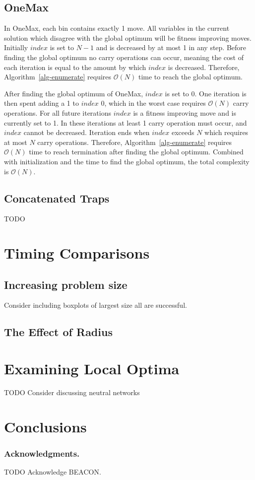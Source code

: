 \documentclass[runningheads,a4paper]{llncs}
\newcommand{\BigO}[1]{$\mathcal{O}{(#1)}$}
\begin{document}
\subsection{OneMax}
In OneMax, each bin contains exactly 1 move. All variables in the current solution
which disagree with the global optimum will be fitness improving moves.
Initially $index$ is set to $N-1$ and is decreased by at most 1 in any step.
Before finding the global optimum no carry operations can occur, meaning the
cost of each iteration is equal to the amount by which $index$ is decreased.
Therefore, Algorithm~\ref{alg-enumerate} requires \BigO{N} time to reach
the global optimum.

After finding the global optimum of OneMax, $index$ is set to 0. One iteration
is then spent adding a 1 to $index$ 0, which in the worst case requires \BigO{N}
carry operations. For all future iterations $index$ is a fitness improving move
and is currently set to 1. In these iterations at least 1 carry operation must
occur, and $index$ cannot be decreased. Iteration ends when $index$ exceeds $N$
which requires at most $N$ carry operations. Therefore, Algorithm~\ref{alg-enumerate}
requires \BigO{N} time to reach termination after finding the global optimum. Combined
with initialization and the time to find the global optimum, the total complexity is \BigO{N}.

\subsection{Concatenated Traps}
TODO

\section{Timing Comparisons}
\subsection{Increasing problem size}
Consider including boxplots of largest size all are successful.

\subsection{The Effect of Radius}

\section{Examining Local Optima}

TODO Consider discussing neutral networks

\section{Conclusions}

\subsubsection*{Acknowledgments.} TODO Acknowledge BEACON.



\end{document}
